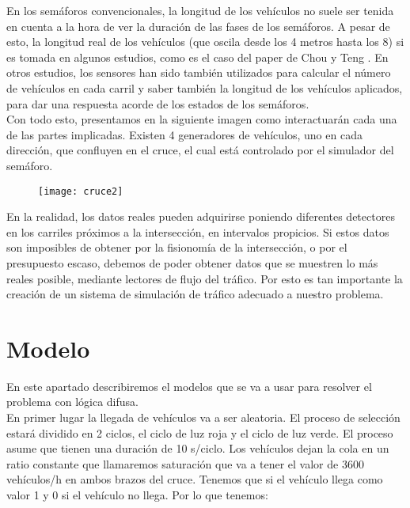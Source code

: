 En los semáforos convencionales, la longitud de los vehículos no suele ser tenida en cuenta a la hora de ver la duración de las fases de los semáforos. A pesar de esto, la longitud real de los vehículos (que oscila desde los 4 metros hasta los 8) si es tomada en algunos estudios, como es el caso del paper de Chou y Teng \cite{Chou}. En otros estudios, los sensores han sido también utilizados para calcular el número de vehículos en cada carril y saber también la longitud de los vehículos aplicados, para dar una respuesta acorde de los estados de los semáforos.\\

Con todo esto, presentamos en la siguiente imagen como interactuarán cada una de las partes implicadas. Existen 4 generadores de vehículos, uno en cada dirección, que confluyen en el cruce, el cual está controlado por el simulador del semáforo.

\begin{figure}[H]
	\centering
	\texttt{[image: cruce2]}

	\label{fig:cruce2}
\end{figure}


En la realidad, los datos reales pueden adquirirse poniendo diferentes detectores en los carriles próximos a la intersección, en intervalos propicios. Si estos datos son imposibles de obtener por la fisionomía de la intersección, o por el presupuesto escaso, debemos de poder obtener datos que se muestren lo más reales posible, mediante lectores de flujo del tráfico. Por esto es tan importante la creación de un sistema de simulación de tráfico adecuado a nuestro problema.


\section{Modelo}

En este apartado describiremos el modelos que se va a usar para resolver el problema con lógica difusa.\\

En primer lugar la llegada de vehículos va a ser aleatoria. El proceso de selección estará dividido en 2 ciclos, el ciclo de luz roja y el ciclo de luz verde. El proceso asume que tienen una duración de 10 s/ciclo. Los vehículos dejan la cola en un ratio constante que llamaremos saturación que va a tener el valor de $3600$ vehículos/h en ambos brazos del cruce.
\newpage
Tenemos que si el vehículo llega como valor 1 y 0 si el vehículo no llega. Por lo que tenemos:

